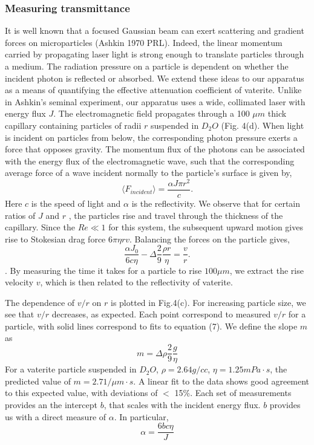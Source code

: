 {\subsubsection*{Measuring transmittance}
	It is well known that a focused Gaussian beam can exert scattering and gradient forces on microparticles (Ashkin 1970 PRL). Indeed, the linear momentum carried by propagating laser light is strong enough to translate particles through a medium. The radiation pressure on a particle is dependent on whether the incident photon is reflected or absorbed. We extend these ideas to our apparatus as a means of quantifying the effective attenuation coefficient of vaterite. 
	Unlike in Ashkin’s seminal experiment, our apparatus uses a wide, collimated laser with energy flux $J$. The electromagnetic field propagates through a 100 $\mu m$ thick capillary containing particles of radii $r$  suspended in $D_{2}O$ (Fig. 4(d). When light is incident on particles from below, the corresponding photon pressure exerts a force that opposes gravity. The momentum flux of the photons can be associated with the energy flux of the electromagnetic wave, such that the corresponding average force of a wave incident normally to the particle's surface is given by, 
$$\langle F_{incident}\rangle=\frac{\alpha J\pi r^2}{c}.$$
Here $c$ is the speed of light and $\alpha$ is the reflectivity.
We observe that for certain ratios of $J$ and $r$ , the particles rise and travel through the thickness of the capillary. Since the $Re\ll1 $ for this system, the subsequent upward motion gives rise to Stokesian drag force $6\pi \eta rv$. Balancing the forces on the particle gives,  
\begin{equation}
\frac {\alpha J_{0} }{6c \eta}-\Delta \frac{2}{9}\frac{\rho r}{\eta} = \frac{v}{r}. 
\end{equation}.
By measuring the time it takes for a particle to rise $100 \mu m$, we extract the rise velocity $v$, which is then related to the reflectivity of vaterite.

The dependence of $v/r$ on $r$  is plotted in Fig.4(c). For increasing particle size, we see that $v/r$ decreases, as expected.  Each point correspond to measured $v/r$ for a particle, with solid lines correspond to fits to equation (7). We define the slope $m$ as $$m=\Delta\rho\frac{2}{9}\frac{g}{\eta}$$
For a vaterite particle suspended in $D_2O$, $\rho=2.64 g/cc$, $\eta=1.25mPa\cdot s$, the predicted value of $m=2.7 1/\mu m\cdot s$. A linear fit to the data shows good agreement to this expected value, with deviations of $<$ 15\%. Each set of measurements provides an the intercept $b$, that scales with the incident energy flux. $b$ provides us with a direct measure of $\alpha$. In particular,  
$$ \alpha=\frac{6bc\eta}{J}$$

}
